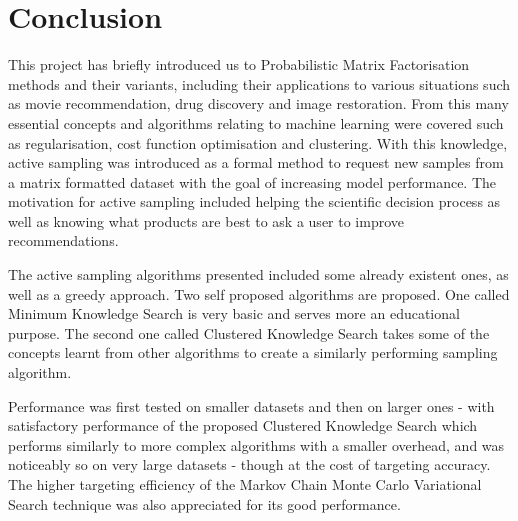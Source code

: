 \def\baselinestretch{1}
\chapter{Conclusion}
\ifpdf
    \graphicspath{{Conclusions/ConclusionsFigs/PNG/}{Conclusions/ConclusionsFigs/PDF/}{Conclusions/ConclusionsFigs/}}
\else
    \graphicspath{{Conclusions/ConclusionsFigs/EPS/}{Conclusions/ConclusionsFigs/}}
\fi


This project has briefly introduced us to Probabilistic Matrix Factorisation methods and their variants, including their applications to various situations such as movie recommendation, drug discovery and image restoration. From this many essential concepts and algorithms relating to machine learning were covered such as regularisation, cost function optimisation and clustering. With this knowledge, active sampling was introduced as a formal method to request new samples from a matrix formatted dataset with the goal of increasing model performance. The motivation for active sampling included helping the scientific decision process as well as knowing what products are best to ask a user to improve recommendations.

The active sampling algorithms presented included some already existent ones, as well as a greedy approach. Two self proposed algorithms are proposed. One called Minimum Knowledge Search is very basic and serves more an educational purpose. The second one called Clustered Knowledge Search takes some of the concepts learnt from other algorithms to create a similarly performing sampling algorithm.

Performance was first tested on smaller datasets and then on larger ones - with satisfactory performance of the proposed Clustered Knowledge Search which performs similarly to more complex algorithms with a smaller overhead, and was noticeably so on very large datasets - though at the cost of targeting accuracy. The higher targeting efficiency of the Markov Chain Monte Carlo Variational Search technique was also appreciated for its good performance.



